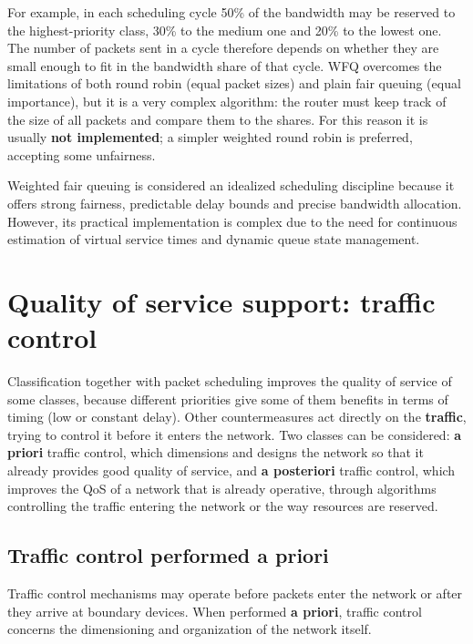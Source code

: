 For example, in each scheduling cycle 50\% of the bandwidth may be reserved to the highest-priority class, 30\% to the medium one and 20\% to the lowest one. The number of packets sent in a cycle therefore depends on whether they are small enough to fit in the bandwidth share of that cycle. WFQ overcomes the limitations of both round robin (equal packet sizes) and plain fair queuing (equal importance), but it is a very complex algorithm: the router must keep track of the size of all packets and compare them to the shares. For this reason it is usually \textbf{not implemented}; a simpler weighted round robin is preferred, accepting some unfairness.

\begin{center}
\end{center}

Weighted fair queuing is considered an idealized scheduling discipline because it offers strong fairness, predictable delay bounds and precise bandwidth allocation. However, its practical implementation is complex due to the need for continuous estimation of virtual service times and dynamic queue state management.

\section{Quality of service support: traffic control}
Classification together with packet scheduling improves the quality of service of some classes, because different priorities give some of them benefits in terms of timing (low or constant delay). Other countermeasures act directly on the \textbf{traffic}, trying to control it before it enters the network. Two classes can be considered: \textbf{a priori} traffic control, which dimensions and designs the network so that it already provides good quality of service, and \textbf{a posteriori} traffic control, which improves the QoS of a network that is already operative, through algorithms controlling the traffic entering the network or the way resources are reserved.

\subsection{Traffic control performed a priori}

Traffic control mechanisms may operate before packets enter the network or after they arrive at boundary devices. When performed \textbf{a priori}, traffic control concerns the dimensioning and organization of the network itself.

